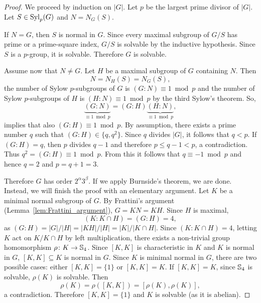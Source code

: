 \begin{proof}
We proceed by induction on $|G|$. Let $p$ be the largest prime divisor of $|G|$. Let 
$S\in\mathrm{Syl}_p(G)$ and $N=N_G(S)$. 

If $N=G$, then $S$ is normal in $G$. Since every 
maximal subgroup of $G/S$ has prime or a prime-square index, 
$G/S$ is solvable by the inductive hypothesis. Since $S$ is a $p$-group, it is solvable. 
Therefore $G$ is solvable. 

Assume now that $N\ne G$. Let $H$ be a maximal subgroup of $G$ containing $N$. Then 
\[
N=N_H(S)=N_G(S),
\]
the number of Sylow $p$-subgroups of $G$ is $(G:N)\equiv1\bmod p$  
and the number of Sylow $p$-subgroups of $H$ is $(H:N)\equiv1\bmod p$ 
by the third Sylow's theorem. So,
\[
\underbrace{(G:N)}_{\equiv1\bmod p} = (G:H)\underbrace{(H:N)}_{\equiv1\bmod p},
\]
implies that also $(G:H)\equiv1\bmod p$.
By assumption, there exists a prime number $q$ 
such that 
$(G:H)\in\{q,q^2\}$. Since $q$ divides $|G|$, it follows that $q<p$. If $(G:H)=q$, then 
$p$ divides $q-1$ and therefore $p\leq q-1<p$, a contradiction. Thus $q^2=(G:H)\equiv 1\bmod p$.
From this it follows that $q\equiv -1\bmod p$ and hence $q=2$ and 
$p=q+1=3$. 

Therefore $G$ has order $2^\alpha 3^ \beta$. 
If we apply Burnside's theorem, we are done. Instead, we will finish the proof with an elementary argument. Let $K$ be a minimal normal subgroup of $G$.
By Frattini's argument (Lemma~\ref{lem:Frattini_argument}),  $G=KN=KH$. Since $H$ is maximal, 
\[
(K:K\cap H) = (G:H)=4, 
\]
as $(G:H)=|G|/|H|=|KH|/|H|=|K|/|K\cap H|$. 
Since $(K:K\cap H)=4$, letting $K$ act on $K/K\cap H$ by left multiplication, there exists 
a non-trivial group homomorphism $\rho\colon K\to\mathbb{S}_4$. Since $[K,K]$ is characteristic in $K$ and $K$ is normal in $G$, $[K,K]\subseteq K$ is normal in $G$. Since $K$ is minimal normal in $G$, 
there are two possible cases: either $[K,K]=\{1\}$ or 
$[K,K]=K$. If $[K,K]=K$, 
since $\mathbb{S}_4$ is solvable, $\rho(K)$ is solvable. Then
\[
\rho(K)=\rho([K,K])=[\rho(K),\rho(K)],
\]
a contradiction. Therefore $[K,K]=\{1\}$ and $K$ is solvable (as it is abelian).
\end{proof}

